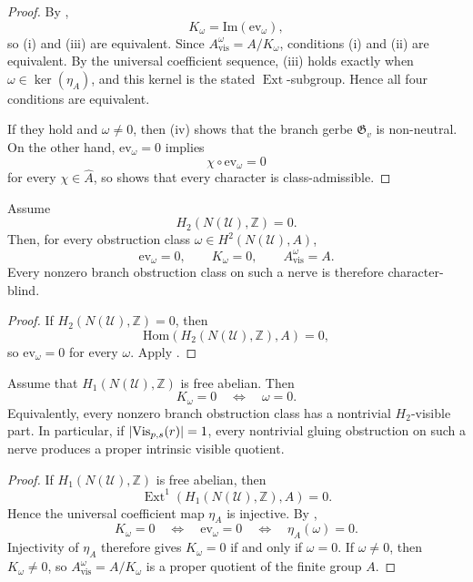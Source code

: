 \begin{proof}
By ,
\[
K_{\omega}=\mathrm{Im}(\mathrm{ev}_{\omega}),
\]
so \textup{(i)} and \textup{(iii)} are equivalent. Since $A_{\mathrm{vis}}^{\omega}=A/K_{\omega}$, conditions \textup{(i)} and \textup{(ii)} are equivalent. By the universal coefficient sequence, \textup{(iii)} holds exactly when $\omega\in\ker(\eta_A)$, and this kernel is the stated $\operatorname{Ext}$-subgroup. Hence all four conditions are equivalent.

If they hold and $\omega\neq 0$, then (iv) shows that the branch gerbe $\mathfrak G_v$ is non-neutral.
On the other hand, $\mathrm{ev}_{\omega}=0$ implies
\[
\chi\circ \mathrm{ev}_{\omega}=0
\]
for every $\chi\in\widehat A$, so  shows that every character is class-admissible.
\end{proof}

\begin{corollary}\label{cor:h2-vanishing-blindness}
Assume
\[
H_2(N(\mathcal U),\mathbb Z)=0.
\]
Then, for every obstruction class $\omega\in H^2(N(\mathcal U),A)$,
\[
\mathrm{ev}_{\omega}=0,
\qquad
K_{\omega}=0,
\qquad
A_{\mathrm{vis}}^{\omega}=A.
\]
Every nonzero branch obstruction class on such a nerve is therefore character-blind.
\end{corollary}

\begin{proof}
If $H_2(N(\mathcal U),\mathbb Z)=0$, then
\[
\mathrm{Hom}(H_2(N(\mathcal U),\mathbb Z),A)=0,
\]
so $\mathrm{ev}_{\omega}=0$ for every $\omega$. Apply .
\end{proof}

\begin{corollary}\label{cor:h1-free-no-blindness}
Assume that $H_1(N(\mathcal U),\mathbb Z)$ is free abelian. Then
\[
K_{\omega}=0
\quad\Longleftrightarrow\quad
\omega=0.
\]
Equivalently, every nonzero branch obstruction class has a nontrivial $H_2$-visible part. In particular, if $|\mathrm{Vis}_{p,s}(r)|=1$, every nontrivial gluing obstruction on such a nerve produces a proper intrinsic visible quotient.
\end{corollary}

\begin{proof}
If $H_1(N(\mathcal U),\mathbb Z)$ is free abelian, then
\[
\operatorname{Ext}^1(H_1(N(\mathcal U),\mathbb Z),A)=0.
\]
Hence the universal coefficient map $\eta_A$ is injective. By ,
\[
K_{\omega}=0
\quad\Longleftrightarrow\quad
\mathrm{ev}_{\omega}=0
\quad\Longleftrightarrow\quad
\eta_A(\omega)=0.
\]
Injectivity of $\eta_A$ therefore gives $K_{\omega}=0$ if and only if $\omega=0$. If $\omega\neq 0$, then $K_{\omega}\neq 0$, so $A_{\mathrm{vis}}^{\omega}=A/K_{\omega}$ is a proper quotient of the finite group $A$.
\end{proof}

